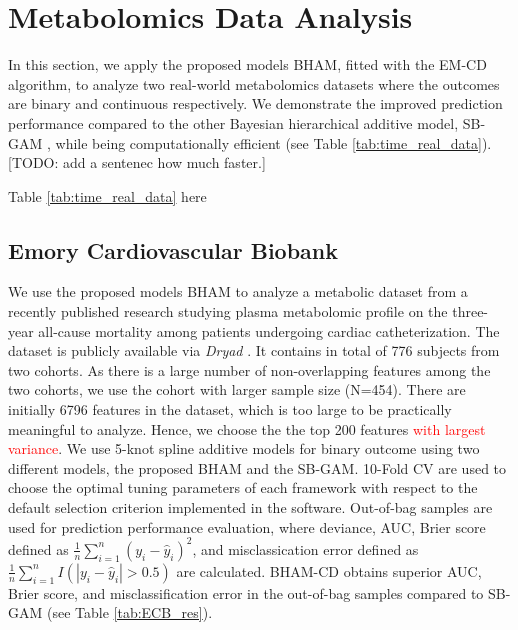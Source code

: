 \documentclass[AMA,STIX1COL,]{WileyNJD-v2}
\begin{document}
\section{Metabolomics Data Analysis}
\label{sec:real_data}

In this section, we apply the proposed models BHAM, fitted with the
EM-CD algorithm, to analyze two real-world metabolomics datasets where
the outcomes are binary and continuous respectively. We demonstrate the
improved prediction performance compared to the other Bayesian
hierarchical additive model, SB-GAM \citep{Bai2021}, while being
computationally efficient (see Table \ref{tab:time_real_data}). {[}TODO:
add a sentenec how much faster.{]}

\begin{center}
Table \ref{tab:time_real_data} here
\end{center}

\subsection{Emory Cardiovascular Biobank}
\label{sec:ECB}

We use the proposed models BHAM to analyze a metabolic dataset from a
recently published research \citep{Mehta2020} studying plasma
metabolomic profile on the three-year all-cause mortality among patients
undergoing cardiac catheterization. The dataset is publicly available
via \textit{Dryad} \citep{Mehta2020_data}. It contains in total of 776
subjects from two cohorts. As there is a large number of non-overlapping
features among the two cohorts, we use the cohort with larger sample
size (N=454). There are initially 6796 features in the dataset, which is
too large to be practically meaningful to analyze. Hence, we choose the
the top 200 features \textcolor{red}{with largest variance}. We use
5-knot spline additive models for binary outcome using two different
models, the proposed BHAM and the SB-GAM. 10-Fold CV are used to choose
the optimal tuning parameters of each framework with respect to the
default selection criterion implemented in the software. Out-of-bag
samples are used for prediction performance evaluation, where deviance,
AUC, Brier score defined as
\(\frac{1}{n}\sum\limits^{n}_{i=1}(y_i - \hat y_i)^2\), and
misclassication error defined as
\(\frac{1}{n}\sum\limits^{n}_{i=1}I(|y_i - \hat y_i|>0.5)\) are
calculated. BHAM-CD obtains superior AUC, Brier score, and
misclassification error in the out-of-bag samples compared to SB-GAM
(see Table \ref{tab:ECB_res}).
\end{document}
